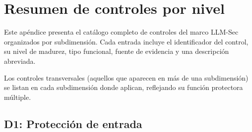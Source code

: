 \chapter{Resumen de controles por nivel}
\label{app:resumen}

Este apéndice presenta el catálogo completo de controles del marco LLM-Sec organizados por subdimensión. Cada entrada incluye el identificador del control, su nivel de madurez, tipo funcional, fuente de evidencia y una descripción abreviada.

Los controles transversales (aquellos que aparecen en más de una subdimensión) se listan en cada subdimensión donde aplican, reflejando su función protectora múltiple.

\section*{D1: Protección de entrada}

